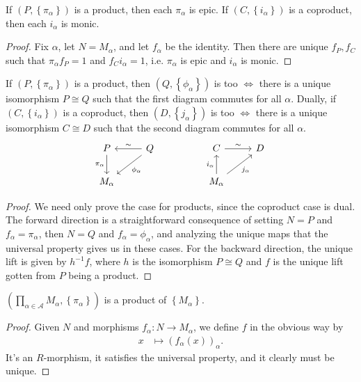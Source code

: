 \documentclass[twoside,10pt]{report}
\begin{document}
\begin{prop}
	If $(P, \left\{ \pi_{\alpha} \right\})$ is a product, then each $\pi_{\alpha}$ is epic. If $(C, \left\{ i_{\alpha} \right\})$ is a coproduct, then each $i_{\alpha}$ is monic.
\end{prop}
\begin{proof}
	Fix $\alpha$, let $N=M_{\alpha}$, and let $f_{\alpha}$ be the identity. Then there are unique $f_{P}, f_{C}$ such that $\pi_{\alpha}f_{P}=1$ and $f_{C}i_{\alpha}=1$, i.e. $\pi_{\alpha}$ is epic and $i_{\alpha}$ is monic.
\end{proof}

\begin{thrm}[Uniqueness]
	If $(P, \left\{ \pi_{\alpha} \right\})$ is a product, then $(Q, \left\{ \phi_{\alpha} \right\})$ is too $\iff$ there is a unique isomorphism $P \cong Q$ such that the first diagram commutes for all $\alpha$. Dually, if $(C, \left\{ i_{\alpha} \right\})$ is a coproduct, then $(D, \left\{ j_{\alpha} \right\})$ is too $\iff$ there is a unique isomorphism $C \cong D$ such that the second diagram commutes for all $\alpha$.
	\[
	\begin{tikzcd}
		P \dar["\pi_{\alpha}"'] & Q \lar["\sim"']\arrow[dl,"\phi_{\alpha}"] & & C \rar{\sim} & D \\
		M_{\alpha} & & & M_{\alpha} \uar{i_{\alpha}}\arrow[ur, "j_{\alpha}"']
	\end{tikzcd}
	\] 
\end{thrm}
\begin{proof}
	We need only prove the case for products, since the coproduct case is dual. The forward direction is a straightforward consequence of setting $N=P$ and $f_{\alpha}=\pi_{\alpha}$, then $N=Q$ and $f_{\alpha}=\phi_{\alpha}$, and analyzing the unique maps that the universal property gives us in these cases. For the backward direction, the unique lift is given by $h^{-1} f$, where $h$ is the isomorphism $P \cong Q$ and $f$ is the unique lift gotten from $P$ being a product.
\end{proof}

\begin{thrm}[Existence]
	$\left(\prod_{\alpha \in \mathcal{A}} M_{\alpha}, \left\{ \pi_{\alpha} \right\}\right)$ is a product of $\left\{ M_{\alpha} \right\}$.
\end{thrm}
\begin{proof}
	Given $N$ and morphisms $f_{\alpha}:N\to M_{\alpha}$, we define $f$ in the obvious way by
	\begin{align*}
		x &\mapsto (f_{\alpha}(x))_{\alpha}.
	\end{align*}
	It's an $R$-morphism, it satisfies the universal property, and it clearly must be unique.
\end{proof}
\end{document}
